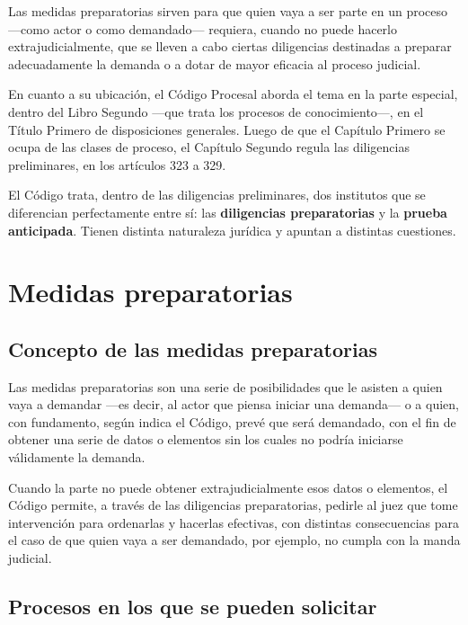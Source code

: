 \documentclass[12pt,oneside]{book}
\begin{document}
Las medidas preparatorias sirven para que quien vaya a ser parte en un proceso —como actor o como demandado— requiera, cuando no puede hacerlo extrajudicialmente, que se lleven a cabo ciertas diligencias destinadas a preparar adecuadamente la demanda o a dotar de mayor eficacia al proceso judicial.

En cuanto a su ubicación, el Código Procesal aborda el tema en la parte especial, dentro del Libro Segundo —que trata los procesos de conocimiento—, en el Título Primero de disposiciones generales. Luego de que el Capítulo Primero se ocupa de las clases de proceso, el Capítulo Segundo regula las diligencias preliminares, en los artículos 323 a 329.

\begin{important}
El Código trata, dentro de las diligencias preliminares, dos institutos que se diferencian perfectamente entre sí: las \textbf{diligencias preparatorias} y la \textbf{prueba anticipada}. Tienen distinta naturaleza jurídica y apuntan a distintas cuestiones.
\end{important}

\chapter{Medidas preparatorias}

\section{Concepto de las medidas preparatorias}

Las medidas preparatorias son una serie de posibilidades que le asisten a quien vaya a demandar —es decir, al actor que piensa iniciar una demanda— o a quien, con fundamento, según indica el Código, prevé que será demandado, con el fin de obtener una serie de datos o elementos sin los cuales no podría iniciarse válidamente la demanda.

Cuando la parte no puede obtener extrajudicialmente esos datos o elementos, el Código permite, a través de las diligencias preparatorias, pedirle al juez que tome intervención para ordenarlas y hacerlas efectivas, con distintas consecuencias para el caso de que quien vaya a ser demandado, por ejemplo, no cumpla con la manda judicial.

\section{Procesos en los que se pueden solicitar}
\end{document}
